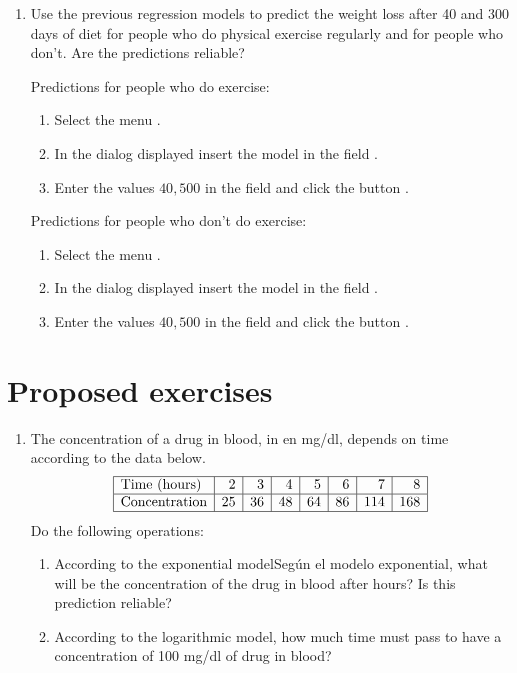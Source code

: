 \begin{enumerate}[leftmargin=*]
\begin{enumerate}
\item Use the previous regression models to predict the weight loss after 40 and 300 days of diet for people who
do physical exercise regularly and for people who don't.
Are the predictions reliable?
\begin{indication}
Predictions for people who do exercise:
\begin{enumerate}
\item Select the menu .
\item In the dialog displayed insert the model  in the field
.
\item Enter the values $40, 500$ in the field  and click the button .
\end{enumerate}
Predictions for people who don't do exercise:
\begin{enumerate}
\item Select the menu .
\item In the dialog displayed insert the model  in the field
.
\item Enter the values $40, 500$ in the field  and click the button .
\end{enumerate}
\end{indication}
\end{enumerate}

\end{enumerate}


\section{Proposed exercises}
\begin{enumerate}[leftmargin=*]
\item The concentration of a drug in blood, in en mg/dl, depends on time according to the data below. 
\[
\begin{array}{|l|r|r|r|r|r|r|r|}
\hline
\mbox{Time (hours)} & 2 & 3 & 4 & 5 & 6 & 7 & 8\\
\hline
\mbox{Concentration} & 25 & 36 & 48 & 64 & 86 & 114 & 168\\
\hline
\end{array}
\]
Do the following operations: 
\begin{enumerate}
\item According to the exponential modelSegún el modelo exponential, what will be the concentration of the drug in blood
after hours?
Is this prediction reliable?
\item According to the logarithmic model, how much time must pass to have a concentration of 100 mg/dl of drug in blood?
\end{enumerate}

\end{enumerate}
